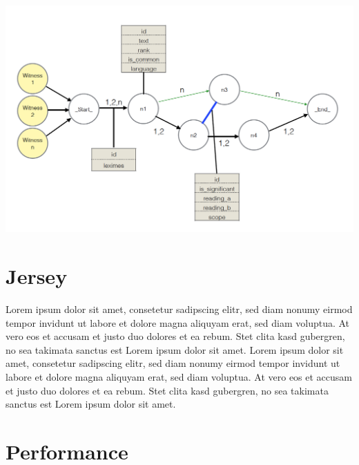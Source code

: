 \documentclass[11pt,fleqn,openany]{book} %
\begin{document}
\begin{center}
\includegraphics[scale=0.65]{Pictures/db_overview2.png} 
\end{center}


\chapter{Jersey}

Lorem ipsum dolor sit amet, consetetur sadipscing elitr, sed diam nonumy eirmod tempor invidunt ut labore et dolore magna aliquyam erat, sed diam voluptua. At vero eos et accusam et justo duo dolores et ea rebum. Stet clita kasd gubergren, no sea takimata sanctus est Lorem ipsum dolor sit amet. Lorem ipsum dolor sit amet, consetetur sadipscing elitr, sed diam nonumy eirmod tempor invidunt ut labore et dolore magna aliquyam erat, sed diam voluptua. At vero eos et accusam et justo duo dolores et ea rebum. Stet clita kasd gubergren, no sea takimata sanctus est Lorem ipsum dolor sit amet.



\chapter{Performance}
\end{document}
